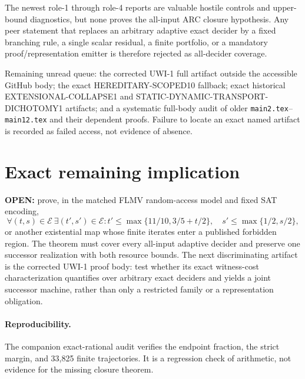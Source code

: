 \documentclass[11pt]{article}
\newcommand{\E}{\mathcal E}
\begin{document}
The newest role-1 through role-4 reports are valuable hostile controls and
upper-bound diagnostics, but none proves the all-input ARC closure hypothesis.
Any peer statement that replaces an arbitrary adaptive exact decider by a
fixed branching rule, a single scalar residual, a finite portfolio, or a
mandatory proof/representation emitter is therefore rejected as all-decider
coverage.

Remaining unread queue: the corrected UWI-1 full artifact outside the accessible
GitHub body; the exact HEREDITARY-SCOPED10 fallback; exact historical
EXTENSIONAL-COLLAPSE1 and STATIC-DYNAMIC-TRANSPORT-DICHOTOMY1 artifacts; and a
systematic full-body audit of older \texttt{main2.tex}--\texttt{main12.tex} and
their dependent proofs.  Failure to locate an exact named artifact is recorded
as failed access, not evidence of absence.

\section{Exact remaining implication}
\textbf{OPEN:} prove, in the matched FLMV random-access model and fixed SAT
encoding,
\[
 \forall(t,s)\in\E\ \exists(t',s')\in\E:
 t'\le\max\{11/10,3/5+t/2\},\quad
 s'\le\max\{1/2,s/2\},
\]
or another existential map whose finite iterates enter a published forbidden
region.  The theorem must cover every all-input adaptive decider and preserve
one successor realization with both resource bounds.  The next discriminating
artifact is the corrected UWI-1 proof body: test whether its exact witness-cost
characterization quantifies over arbitrary exact deciders and yields a joint
successor machine, rather than only a restricted family or a representation
obligation.

\paragraph{Reproducibility.}
The companion exact-rational audit verifies the endpoint fraction, the strict
margin, and 33,825 finite trajectories.  It is a regression check of arithmetic,
not evidence for the missing closure theorem.
\end{document}
